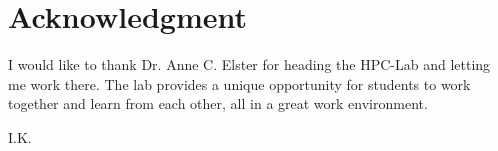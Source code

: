 \section*{Acknowledgment}
I would like to thank Dr. Anne C. Elster for heading the HPC-Lab and letting me work there. The lab provides a unique opportunity for students to work together and learn from each other, all in a great work environment.
\begin{flushright}
I.K.\\[1pc]
\end{flushright}